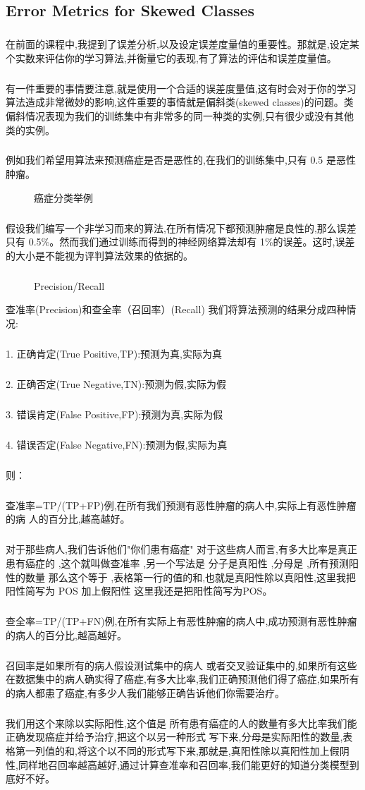 \documentclass{article}
\begin{document}
\begin{CJK}{UTF8}{gbsn}
\subsection{Error Metrics for Skewed Classes}
\subparagraph{}
在前面的课程中,我提到了误差分析,以及设定误差度量值的重要性。那就是,设定某
个实数来评估你的学习算法,并衡量它的表现,有了算法的评估和误差度量值。
\subparagraph{}
有一件重要的事情要注意,就是使用一个合适的误差度量值,这有时会对于你的学习算法造成非常微妙的影响,这件重要的事情就是偏斜类(skewed classes)的问题。类偏斜情况表现为我们的训练集中有非常多的同一种类的实例,只有很少或没有其他类的实例。
\subparagraph{}
例如我们希望用算法来预测癌症是否是恶性的,在我们的训练集中,只有 0.5%
是恶性肿瘤。
\begin{figure}[H]
\label{fig:685}
\caption{癌症分类举例}
\end{figure}
\subparagraph{}
假设我们编写一个非学习而来的算法,在所有情况下都预测肿瘤是良性的,那么误差只有 0.5\%{}。然而我们通过训练而得到的神经网络算法却有 1\%{}的误差。这时,误差的大小是不能视为评判算法效果的依据的。
\subparagraph{}
\begin{figure}[H]
\label{fig:684}
\caption{Precision/Recall}
\end{figure}
查准率(Precision)和查全率（召回率）(Recall) 我们将算法预测的结果分成四种情况:
\subparagraph{}
1. 正确肯定(True Positive,TP):预测为真,实际为真
\subparagraph{}
2. 正确否定(True Negative,TN):预测为假,实际为假
\subparagraph{}
3. 错误肯定(False Positive,FP):预测为真,实际为假
\subparagraph{}
4. 错误否定(False Negative,FN):预测为假,实际为真
\subparagraph{}
则：
\subparagraph{}
查准率=TP/(TP+FP)例,在所有我们预测有恶性肿瘤的病人中,实际上有恶性肿瘤的病
人的百分比,越高越好。
\subparagraph{}
对于那些病人,我们告诉他们"你们患有癌症" 对于这些病人而言,有多大比率是真正患有癌症的 ,这个就叫做查准率 ,另一个写法是 分子是真阳性 ,分母是 ,所有预测阳性的数量 那么这个等于 ,表格第一行的值的和,也就是真阳性除以真阳性,这里我把阳性简写为 POS 加上假阳性 这里我还是把阳性简写为POS。
\subparagraph{}
查全率=TP/(TP+FN)例,在所有实际上有恶性肿瘤的病人中,成功预测有恶性肿瘤的病人的百分比,越高越好。
\subparagraph{}
召回率是如果所有的病人假设测试集中的病人 或者交叉验证集中的,如果所有这些在数据集中的病人确实得了癌症,有多大比率,我们正确预测他们得了癌症,如果所有的病人都患了癌症,有多少人我们能够正确告诉他们你需要治疗。
\subparagraph{}
我们用这个来除以实际阳性,这个值是 所有患有癌症的人的数量有多大比率我们能正确发现癌症并给予治疗,把这个以另一种形式 写下来,分母是实际阳性的数量,表格第一列值的和,将这个以不同的形式写下来,那就是,真阳性除以真阳性加上假阴性,同样地召回率越高越好,通过计算查准率和召回率,我们能更好的知道分类模型到底好不好。

\end{CJK}
\end{document}
